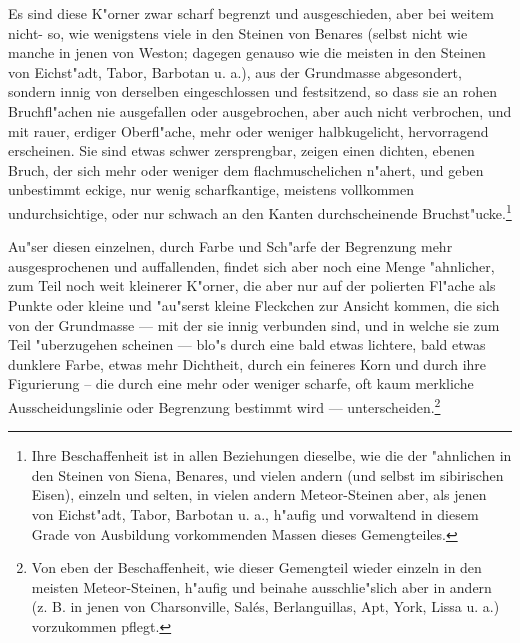 \documentclass[a4paper, 11pt, oneside, german]{article}
\begin{document}
Es sind diese K"orner zwar scharf begrenzt und ausgeschieden, aber bei weitem nicht- so, wie wenigstens viele in den Steinen von Benares (selbst nicht wie manche in jenen von Weston; dagegen genauso wie die meisten in den Steinen von Eichst"adt, Tabor, Barbotan u. a.), aus der Grundmasse abgesondert, sondern innig von derselben eingeschlossen und festsitzend, so dass sie an rohen Bruchfl"achen nie ausgefallen oder ausgebrochen, aber auch nicht verbrochen, und mit rauer, erdiger Oberfl"ache, mehr oder weniger halbkugelicht, hervorragend erscheinen. Sie sind etwas schwer zersprengbar, zeigen einen dichten, ebenen Bruch, der sich mehr oder weniger dem flachmuschelichen n"ahert, und geben unbestimmt eckige, nur wenig scharfkantige, meistens vollkommen undurchsichtige, oder nur schwach an den Kanten durchscheinende Bruchst"ucke.\footnote{Ihre Beschaffenheit ist in allen Beziehungen dieselbe, wie die der "ahnlichen in den Steinen von Siena, Benares, und vielen andern (und selbst im sibirischen Eisen), einzeln und selten, in vielen andern Meteor-Steinen aber, als jenen von Eichst"adt, Tabor, Barbotan u. a., h"aufig und vorwaltend in diesem Grade von Ausbildung vorkommenden Massen dieses Gemengteiles.}

Au"ser diesen einzelnen, durch Farbe und Sch"arfe der Begrenzung mehr ausgesprochenen und auffallenden, findet sich aber noch eine Menge "ahnlicher, zum Teil noch weit kleinerer K"orner, die aber nur auf der polierten Fl"ache als Punkte oder kleine und "au"serst kleine Fleckchen zur Ansicht kommen, die sich von der Grundmasse --- mit der sie innig verbunden sind, und in welche sie zum Teil "uberzugehen scheinen --- blo"s durch eine bald etwas lichtere, bald etwas dunklere Farbe, etwas mehr Dichtheit, durch ein feineres Korn und durch ihre Figurierung -- die durch eine mehr oder weniger scharfe, oft kaum merkliche Ausscheidungslinie oder Begrenzung bestimmt wird --- unterscheiden.\footnote{Von eben der Beschaffenheit, wie dieser Gemengteil wieder einzeln in den meisten Meteor-Steinen, h"aufig und beinahe ausschlie"slich aber in andern (z. B. in jenen von Charsonville, Salés, Berlanguillas, Apt, York, Lissa u. a.) vorzukommen pflegt.}
\end{document}
